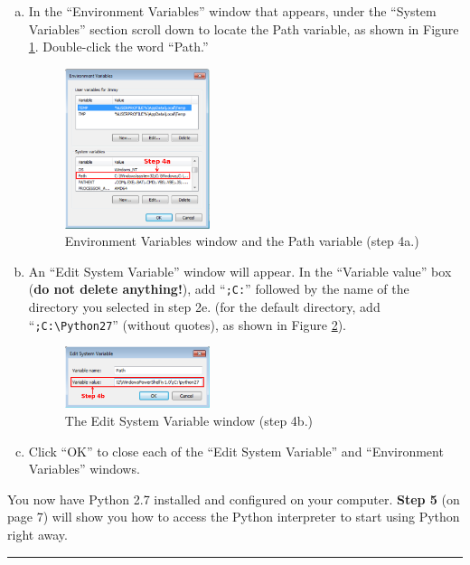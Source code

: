 \documentclass[11pt,english]{article}
\newcommand{\myhrule}{\vspace{0.3cm}\hrule\vspace{0.3cm}}
\begin{document}
\begin{enumerate}[a.]
\item In the ``Environment Variables'' window that appears, under the ``System
Variables'' section scroll down to locate the Path variable, as shown in Figure
\ref{fig:dia7}. Double-click the word ``Path.''
\begin{figure}[h]
\begin{center}
\includegraphics[width=0.4\textwidth]{dia7}
\end{center}
\vspace{-0.5cm}
\caption{Environment Variables window and the Path variable (step 4a.)}
\label{fig:dia7}
\end{figure}
\item An ``Edit System Variable'' window will appear. In the ``Variable value''
box ({\bf do not delete anything!}), add ``\texttt{;C:}'' followed by the name of the
directory you selected in step 2e. (for the default directory, add
``\texttt{;C:\textbackslash Python27}'' (without quotes), as shown in Figure
\ref{fig:dia8}).
\begin{figure}[h]
\begin{center}
\includegraphics[width=0.4\textwidth]{dia8}
\end{center}
\vspace{-0.5cm}
\caption{The Edit System Variable window (step 4b.)}
\label{fig:dia8}
\end{figure}
\item Click ``OK'' to close each of the ``Edit System Variable'' and
``Environment Variables'' windows.
\end{enumerate}
\vfill
You now have Python 2.7 installed and configured on your computer. {\bf Step 5}
(on page 7) will show you how to access the Python interpreter to start using
Python right away.
\myhrule
\end{document}
